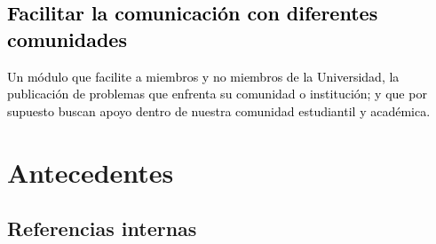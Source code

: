 \documentclass[11pt,letterpaper,titlepage]{article}
\begin{document}
\textcolor{black}{
\subsection{Facilitar la comunicaci\'on con diferentes comunidades}
Un m\'odulo que facilite a miembros y no miembros de la Universidad, la publicaci\'on de problemas que enfrenta su comunidad o instituci\'on; y que por supuesto buscan apoyo dentro de nuestra comunidad estudiantil y acad\'emica. }


\section{Antecedentes}
\subsection{Referencias internas}
\end{document}
